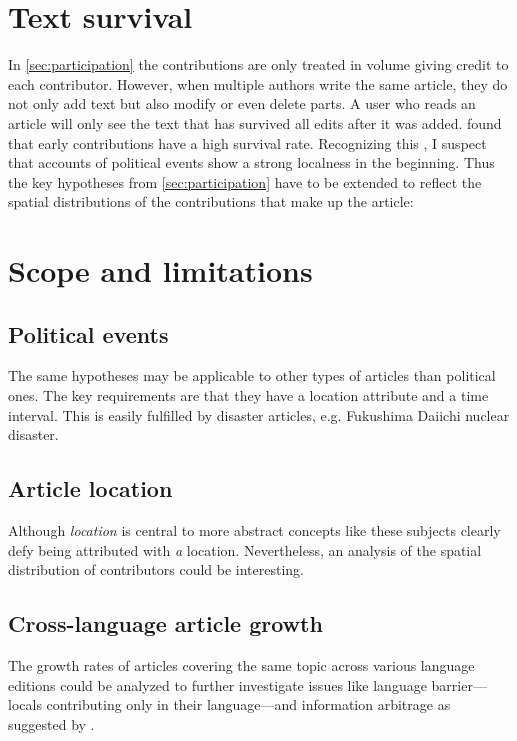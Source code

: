 
\section{Text survival}\label{sec:textsurvival}

In \ref{sec:participation} the contributions are only treated in volume giving credit to each contributor.
However, when multiple authors write the same article, they do not only add text but also modify or even delete parts.
A user who reads an article will only see the text that has survived all edits after it was added.
\textcite{viegas2004history} found that early contributions have a high survival rate.
Recognizing this , I suspect that accounts of political events show a strong localness in the beginning.
Thus the key hypotheses from \ref{sec:participation} have to be extended to reflect the spatial distributions of the contributions that make up the article:



\section{Scope and limitations}

\subsection{Political events}
The same hypotheses may be applicable to other types of articles than political ones.
The key requirements are that they have a location attribute and a time interval.
This is easily fulfilled by disaster articles, e.g. Fukushima Daiichi nuclear disaster.

\subsection{Article location}
Although \emph{location} is central to more abstract concepts like  these subjects clearly defy being attributed with \emph{a} location.
Nevertheless, an analysis of the spatial distribution of contributors could be interesting. 

\subsection{Cross-language article growth}
The growth rates of articles covering the same topic across various language editions could be analyzed to further investigate issues like language barrier---locals contributing only in their language---and information arbitrage as suggested by \textcite{adar2009information}.
